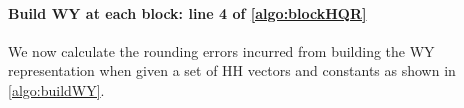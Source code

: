 \paragraph{Build WY at each block: line 4 of \cref{algo:blockHQR}}
We now calculate the rounding errors incurred from building the WY representation when given a set of HH vectors and constants as shown in \cref{algo:buildWY}.
